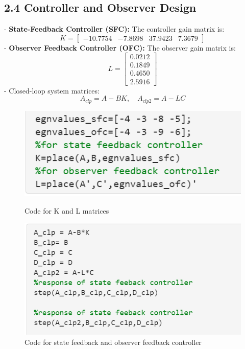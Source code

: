 \documentclass[a4paper,12pt]{article}
\begin{document}
\subsection*{2.4 Controller and Observer Design}
- \textbf{State-Feedback Controller (SFC):} The controller gain matrix is:
\[
K = \begin{bmatrix} -10.7754 & -7.8698 & 37.9423 & 7.3679 \end{bmatrix}
\]
- \textbf{Observer Feedback Controller (OFC):} The observer gain matrix is:
\[
L = \begin{bmatrix}
0.0212 \\ 0.1849 \\ 0.4650 \\ 2.5916
\end{bmatrix}
\]
- Closed-loop system matrices:
\[
A_{clp} = A - BK, \quad A_{clp2} = A - LC
\]

\begin{figure}[h!]
    \centering
    \begin{minipage}{0.45\textwidth}
        \centering
        \includegraphics[width=\textwidth]{eigen_values.png}
        \caption{Code for K and L matrices}
    
    \end{minipage}
    \hfill
    \begin{minipage}{0.45\textwidth}
        \centering
        \includegraphics[width=\textwidth]{responses_code.png}
        \caption{Code for state feedback and observer feedback controller}
    \end{minipage}
\end{figure}
\end{document}
